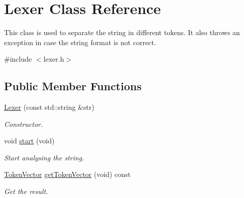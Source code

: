 \hypertarget{class_lexer}{}\section{Lexer Class Reference}
\label{class_lexer}


This class is used to separate the string in different tokens. It also throws an exception in case the string format is not correct.  




{\ttfamily \#include $<$lexer.\+h$>$}

\subsection*{Public Member Functions}
\begin{DoxyCompactItemize}
\item 
\hyperlink{class_lexer_a643965a215d7b8f84be82239465fea5f}{Lexer} (const std\+::string \&str)
\begin{DoxyCompactList}\small\item\em Constructor. \end{DoxyCompactList}\item 
\hypertarget{class_lexer_a38b525bdff5c3f3aca8c19838b480086}{}void \hyperlink{class_lexer_a38b525bdff5c3f3aca8c19838b480086}{start} (void)\label{class_lexer_a38b525bdff5c3f3aca8c19838b480086}

\begin{DoxyCompactList}\small\item\em Start analysing the string. \end{DoxyCompactList}\item 
\hyperlink{token_8h_a8318de25ae453e04997e41e88c9fad7d}{Token\+Vector} \hyperlink{class_lexer_ad590d7968a57fdbe5bc1df94364851e8}{get\+Token\+Vector} (void) const 
\begin{DoxyCompactList}\small\item\em Get the result. \end{DoxyCompactList}\end{DoxyCompactItemize}
